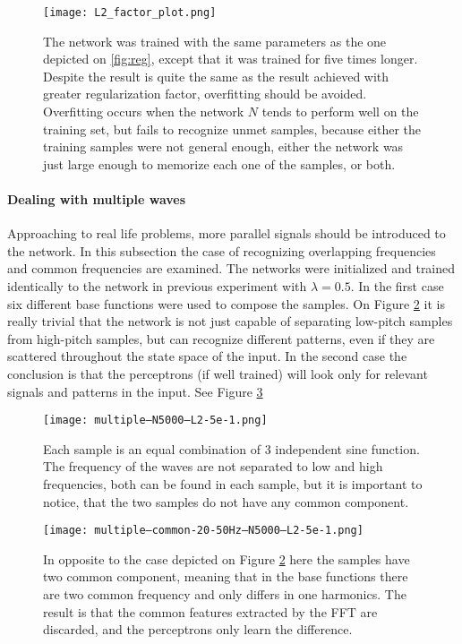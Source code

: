 \begin{figure}
	\centering
	\texttt{[image: L2\_factor\_plot.png]}
	\caption{The network was trained with the same parameters as the one depicted on \ref{fig:reg}, except that it was trained for five times longer. Despite the result is quite the same as the result achieved with greater regularization factor, overfitting should be avoided. Overfitting occurs when the network $N$ tends to perform well on the training set, but fails to recognize unmet samples, because either the training samples were not general enough, either the network was just large enough to memorize each one of the samples, or both. }
	
	\label{fig:overtrain}
\end{figure}


\paragraph{Dealing with multiple waves}
Approaching to real life problems, more parallel signals should be introduced to the network. In this subsection the case of recognizing overlapping frequencies and common frequencies are examined. The networks were initialized and trained identically to the network in previous experiment with $\lambda=0.5$. In the first case six different base functions were used to compose the samples. On Figure \ref{fig:multi} it is really trivial that the network is not just capable of separating low-pitch samples from high-pitch samples, but can recognize different patterns, even if they are scattered throughout the state space of the input. In the second case the conclusion is that the perceptrons (if well trained) will look only for relevant signals and patterns in the input.  See Figure \ref{fig:multi-common} \\

\begin{figure}
	\centering
	\texttt{[image: multiple---N5000---L2-5e-1.png]}
	\caption{Each sample is an equal combination of 3 independent sine function. The frequency of the waves are not separated to low and high frequencies, both can be found in each sample, but it is important to notice, that the two samples do not have any common component.}
	
	\label{fig:multi}
\end{figure}


\begin{figure}
	\centering
	\texttt{[image: multiple--common-20-50Hz--N5000---L2-5e-1.png]}
	\caption{In opposite to the case depicted on Figure \ref{fig:multi} here the samples have two common component, meaning that in the base functions there are two common frequency and only differs in one harmonics. The result is that the common features extracted by the FFT are discarded, and the perceptrons only learn the difference.}
	
	\label{fig:multi-common}
\end{figure}

